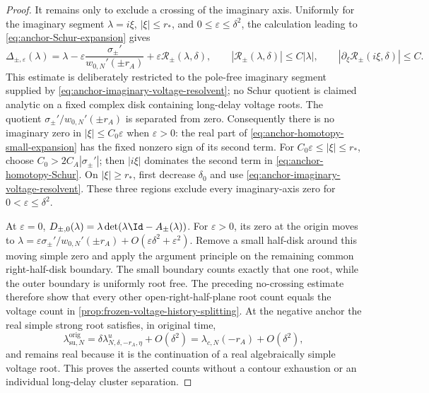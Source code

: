 \begin{proof}
It remains only to exclude a crossing of the imaginary axis.  Uniformly
for the imaginary segment \(\lambda=i\xi\), \(|\xi|\le r_*\), and
\(0\le\varepsilon\le\delta^2\), the calculation leading to
\cref{eq:anchor-Schur-expansion} gives
\begin{equation}
 \Delta_{\pm,\varepsilon}(\lambda)
 =\lambda-\varepsilon
       \frac{\sigma_\pm'}{w_{0,N}'(\pm r_A)}
 +\varepsilon\mathcal R_\pm(\lambda,\delta),
 \qquad
 |\mathcal R_\pm(\lambda,\delta)|\le C|\lambda|,
 \qquad
 |\partial_\xi\mathcal R_\pm(i\xi,\delta)|\le C. \label{eq:anchor-homotopy-small-expansion}
\end{equation}
This estimate is deliberately restricted to the pole-free imaginary
segment supplied by \cref{eq:anchor-imaginary-voltage-resolvent}; no Schur
quotient is claimed analytic on a fixed complex disk containing long-delay
voltage roots.
The quotient \(\sigma_\pm'/w_{0,N}'(\pm r_A)\) is separated
from zero.  Consequently there is no imaginary zero in
\(|\xi|\le C_0\varepsilon\) when \(\varepsilon>0\): the real
part of \cref{eq:anchor-homotopy-small-expansion} has the fixed nonzero
sign of its second term.  For
\(C_0\varepsilon\le|\xi|\le r_*\), choose \(C_0>2C_A|\sigma_\pm'|\);
then \(|i\xi|\) dominates the second term in
\cref{eq:anchor-homotopy-Schur}.  On \(|\xi|\ge r_*\), first
decrease \(\delta_0\) and use
\cref{eq:anchor-imaginary-voltage-resolvent}.  These three regions
exclude every imaginary-axis zero for \(0<\varepsilon\le\delta^2\).

At \(\varepsilon=0\),
\(D_{\pm,0}(\lambda)=\lambda\det(\lambda\Id-A_\pm(\lambda))\).
For \(\varepsilon>0\), its zero at the origin moves to
\(\lambda=\varepsilon\sigma_\pm'/w_{0,N}'(\pm r_A)
+O(\varepsilon\delta^2+\varepsilon^2)\).  Remove a small half-disk around
this moving simple zero and apply the argument principle on the remaining
common right-half-disk boundary.  The small boundary counts exactly that
one root, while the outer boundary is uniformly root free.  The preceding
no-crossing estimate therefore
show that every other open-right-half-plane root count equals the voltage
count in \cref{prop:frozen-voltage-history-splitting}.  At the negative
anchor the real simple strong root satisfies, in original time,
\begin{equation}
 \lambda_{\mathrm{su},N}^{\mathrm{orig}}
 =\delta\lambda^u_{N,\delta,-r_A,\eta}+O(\delta^2)
 =\lambda_{c,N}(-r_A)+O(\delta^2),          \label{eq:anchor-strong-root-original-time}
\end{equation}
and remains real because it is the continuation of a real algebraically
simple voltage root.  This proves the asserted counts without a contour
exhaustion or an individual long-delay cluster separation.
\end{proof}

